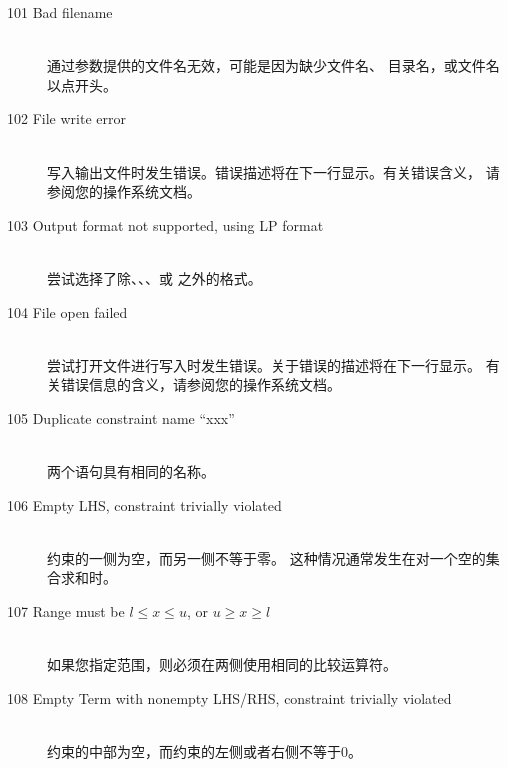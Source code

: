\begin{description}
%
%
\item[101 Bad filename]\ \\
   通过参数提供的文件名无效，可能是因为缺少文件名、
   目录名，或文件名以点开头。
\item[102 File write error]\ \\
   写入输出文件时发生错误。错误描述将在下一行显示。有关错误含义，
   请参阅您的操作系统文档。
\item[103 Output format not supported, using LP format]\ \\
   尝试选择了除、、、或
   之外的格式。
\item[104 File open failed]\ \\
   尝试打开文件进行写入时发生错误。关于错误的描述将在下一行显示。
   有关错误信息的含义，请参阅您的操作系统文档。
%
%
\item[105 Duplicate constraint name ``xxx'']\ \\
   两个语句具有相同的名称。
\item[106 Empty LHS, constraint trivially violated]\ \\
   约束的一侧为空，而另一侧不等于零。
   这种情况通常发生在对一个空的集合求和时。
\item[107 Range must be $l\leq x\leq u$, or $u \geq x\geq l$]\ \\
   如果您指定范围，则必须在两侧使用相同的比较运算符。
\item[108 Empty Term with nonempty LHS/RHS, constraint trivially violated]\ \\
   约束的中部为空，而约束的左侧或者右侧不等于0。

\end{description}
